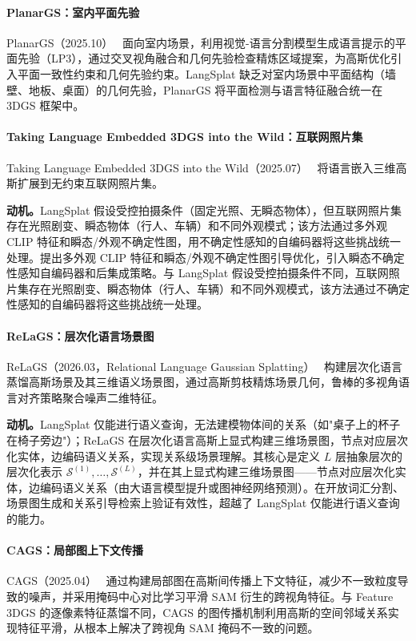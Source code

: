 \paragraph{PlanarGS：室内平面先验} PlanarGS（2025.10）~\cite{2510_23930} 面向室内场景，利用视觉-语言分割模型生成语言提示的平面先验（LP3），通过交叉视角融合和几何先验检查精炼区域提案，为高斯优化引入平面一致性约束和几何先验约束。LangSplat 缺乏对室内场景中平面结构（墙壁、地板、桌面）的几何先验，PlanarGS 将平面检测与语言特征融合统一在 3DGS 框架中。

\paragraph{Taking Language Embedded 3DGS into the Wild：互联网照片集} Taking Language Embedded 3DGS into the Wild（2025.07）~\cite{2507_19830} 将语言嵌入三维高斯扩展到无约束互联网照片集。

\textbf{动机。}LangSplat 假设受控拍摄条件（固定光照、无瞬态物体），但互联网照片集存在光照剧变、瞬态物体（行人、车辆）和不同外观模式；该方法通过多外观 CLIP 特征和瞬态/外观不确定性图，用不确定性感知的自编码器将这些挑战统一处理。提出多外观 CLIP 特征和瞬态/外观不确定性图引导优化，引入瞬态不确定性感知自编码器和后集成策略。与 LangSplat 假设受控拍摄条件不同，互联网照片集存在光照剧变、瞬态物体（行人、车辆）和不同外观模式，该方法通过不确定性感知的自编码器将这些挑战统一处理。

\paragraph{ReLaGS：层次化语言场景图} ReLaGS（2026.03，Relational Language Gaussian Splatting）~\cite{2603_17605} 构建层次化语言蒸馏高斯场景及其三维语义场景图，通过高斯剪枝精炼场景几何，鲁棒的多视角语言对齐策略聚合噪声二维特征。

\textbf{动机。}LangSplat 仅能进行语义查询，无法建模物体间的关系（如"桌子上的杯子在椅子旁边"）；ReLaGS 在层次化语言高斯上显式构建三维场景图，节点对应层次化实体，边编码语义关系，实现关系级场景理解。其核心是定义 $L$ 层抽象层次的层次化表示 $\mathcal{S}^{(1)}, \ldots, \mathcal{S}^{(L)}$，并在其上显式构建三维场景图——节点对应层次化实体，边编码语义关系（由大语言模型提升或图神经网络预测）。在开放词汇分割、场景图生成和关系引导检索上验证有效性，超越了 LangSplat 仅能进行语义查询的能力。

\paragraph{CAGS：局部图上下文传播} CAGS（2025.04）~\cite{2504_11893} 通过构建局部图在高斯间传播上下文特征，减少不一致粒度导致的噪声，并采用掩码中心对比学习平滑 SAM 衍生的跨视角特征。与 Feature 3DGS 的逐像素特征蒸馏不同，CAGS 的图传播机制利用高斯的空间邻域关系实现特征平滑，从根本上解决了跨视角 SAM 掩码不一致的问题。

